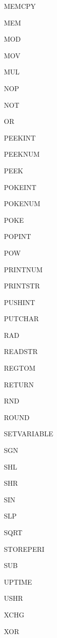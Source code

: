 \begin{multicols}{6}
MEMCPY\par
MEM\par
MOD\par
MOV\par
MUL\par
NOP\par
NOT\par
OR\par
PEEKINT\par
PEEKNUM\par
PEEK\par
POKEINT\par
POKENUM\par
POKE\par
POPINT\par
POW\par
PRINTNUM\par
PRINTSTR\par
PUSHINT\par
PUTCHAR\par
RAD\par
READSTR\par
REGTOM\par
RETURN\par
RND\par
ROUND\par
SETVARIABLE\par
SGN\par
SHL\par
SHR\par
SIN\par
SLP\par
SQRT\par
STOREPERI\par
SUB\par
UPTIME\par
USHR\par
XCHG\par
XOR\par

\end{multicols}
